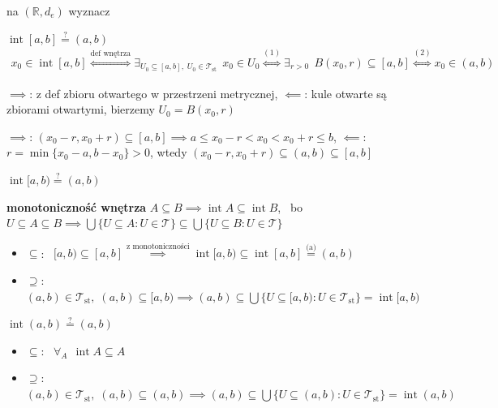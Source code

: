 \documentclass[a4paper,12pt]{article}
\begin{document}
\bigskip
{} \; na \((\mathbb{R}, d_e)\) wyznacz
\begin{podpunkty}
    \item \(\operatorname{int}[a, b] \overset{?}{=} (a, b)\)
    \begin{align*}
    x_0 \in \operatorname{int}[a, b] \overset{\text{def wnętrza}}{\iff} \exists_{U_0 \subseteq [a, b], \; U_0 \in \mathcal{T}_{\text{st}}} \;\, x_0 \in U_0 \overset{(1)}{\iff} \exists_{r > 0} \;\, B(x_0, r) \subseteq [a, b] \overset{(2)}{\iff} x_0 \in (a, b)
    \end{align*}
    \begin{steps}
        \item \(\implies\): z def zbioru otwartego w przestrzeni metrycznej, \; \(\impliedby\): kule otwarte są zbiorami otwartymi, bierzemy \(U_0 = B(x_0, r)\)
        \item \(\implies\): \((x_0 - r, x_0 + r) \subseteq [a, b] \implies a \leq x_0 - r < x_0 < x_0 + r \leq b\), \; \(\impliedby\): \(r = \min\{x_0 - a, b - x_0\} > 0\), wtedy \((x_0 - r, x_0 + r) \subseteq (a, b) \subseteq [a, b]\)
    \end{steps}
    \item \(\operatorname{int}[a, b) \overset{?}{=} (a, b)\)

    \smallskip
    \textbf{monotoniczność wnętrza} \; \(A \subseteq B \implies \operatorname{int} A \subseteq \operatorname{int} B\), \, bo \(U \subseteq A \subseteq B \implies \bigcup \{U \subseteq A : U \in \mathcal{T}\} \subseteq \bigcup \{U \subseteq B : U \in \mathcal{T}\}\)
    \begin{itemize}
        \item \(\subseteq\): \, \([a, b) \subseteq [a, b] \overset{\text{z monotoniczności}}{\implies} \operatorname{int}[a, b) \subseteq \operatorname{int}[a, b] \overset{\text{(a)}}{=} (a, b)\)
        \item \(\supseteq\): \, \((a, b) \in \mathcal{T}_{\text{st}}, \; (a, b) \subseteq [a, b) \implies (a, b) \subseteq \bigcup \{U \subseteq [a, b) : U \in \mathcal{T}_{\text{st}}\} = \operatorname{int}[a, b)\)
    \end{itemize}
    \item \(\operatorname{int}(a, b) \overset{?}{=} (a, b)\)
    \begin{itemize}
        \item \(\subseteq\): \, \(\forall_A \;\, \operatorname{int} A \subseteq A\)
        \item \(\supseteq\): \, \((a, b) \in \mathcal{T}_{\text{st}}, \; (a, b) \subseteq (a, b) \implies (a, b) \subseteq \bigcup \{U \subseteq (a, b) : U \in \mathcal{T}_{\text{st}}\} = \operatorname{int}(a, b)\)
    \end{itemize}
\end{podpunkty}
\end{document}
